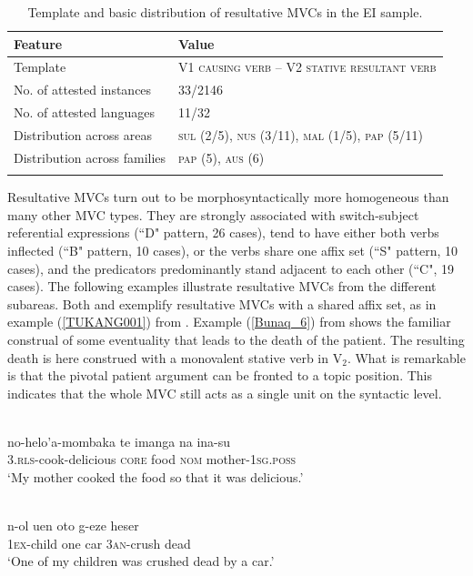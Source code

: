 \begin{table}
\begin{tabular}{ll}
\lsptoprule
Feature&Value\tabularnewline
\midrule
Template&V1 \textsc{causing verb} -- V2 \textsc{stative resultant verb}\tabularnewline
No. of attested instances& 33/2146 \tabularnewline
No. of attested languages& 11/32 \tabularnewline
Distribution across areas& \textsc{sul} (2/5), \textsc{nus} (3/11), \textsc{mal} (1/5), \textsc{pap} (5/11) \tabularnewline
Distribution across families& \textsc{pap} (5), \textsc{aus} (6) \tabularnewline
\lspbottomrule
\end{tabular}
\caption[Template and basic distribution of resultative MVCs]{Template and basic distribution of resultative MVCs in the EI sample. }
\label{table:resultative}
\end{table}

Resultative MVCs turn out to be morphosyntactically more homogeneous than many other MVC types. They are strongly associated with switch-subject referential expressions (``D" pattern, 26 cases), tend to have either both verbs inflected (``B" pattern, 10 cases), or the verbs share one affix set (``S" pattern, 10 cases), and the predicators predominantly stand adjacent to each other (``C", 19 cases). The following examples illustrate resultative MVCs from the different subareas. Both  and  exemplify resultative MVCs with a shared affix set, as in example (\ref{TUKANG001}) from . Example (\ref{Bunaq_6}) from  shows the familiar construal of some eventuality that leads to the death of the patient. The resulting death is here construed with a monovalent stative verb in V$_2$. What is remarkable is that the pivotal patient argument can be fronted to a topic position. This indicates that the whole MVC still acts as a single unit on the syntactic level. 

\ea \label{TUKANG001}
\\
\gll no-helo'a-mombaka te imanga na ina-su \\
\textsc{3}.\textsc{rls}-cook-delicious \textsc{core} food \textsc{nom} mother-\textsc{1}\textsc{sg}.\textsc{poss} \\
\glft `My mother cooked the food so that it was delicious.'\\ 
\z

\ea \label{Bunaq_6}
\\
\gll n-ol uen oto g-eze heser \\
1\textsc{ex}-child one car 3\textsc{an}-crush dead \\
\glft `One of my children was crushed dead by a car.’\\ 
\z

